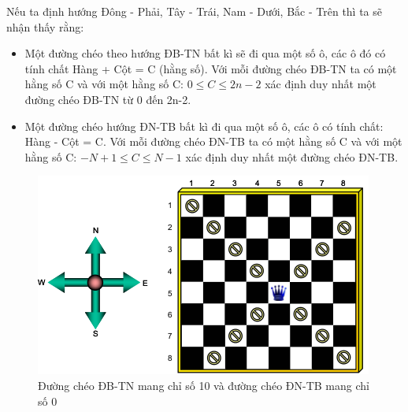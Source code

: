 \documentclass[8pt, a4paper]{article}
\begin{document}
Nếu ta định hướng Đông - Phải, Tây - Trái, Nam - Dưới, Bắc - Trên thì ta sẽ nhận thấy rằng:
\begin{itemize}
\item Một đường chéo theo hướng ĐB-TN bất kì sẽ đi qua một số ô, các ô đó có tính chất Hàng + Cột = C (hằng số). Với mỗi đường chéo ĐB-TN ta có một hằng số C và với một hằng số C: $0 \le C \le 2n-2$ xác định duy nhất một đường chéo ĐB-TN từ 0 đến 2n-2.
\item Một đường chéo hướng ĐN-TB bất kì đi qua một số ô, các ô có tính chất: Hàng - Cột = C. Với mỗi đường chéo ĐN-TB ta có một hằng số C và với một hằng số C: $-N+1 \le C \le N-1$ xác định duy nhất một đường chéo ĐN-TB.
\end{itemize}
\begin{figure}[htp]
\centering
\includegraphics[scale=0.5]{img/quanhau.png}
\caption{Đường chéo ĐB-TN mang chỉ số 10 và đường chéo ĐN-TB mang chỉ số 0}
\label{}
\end{figure}
\end{document}
